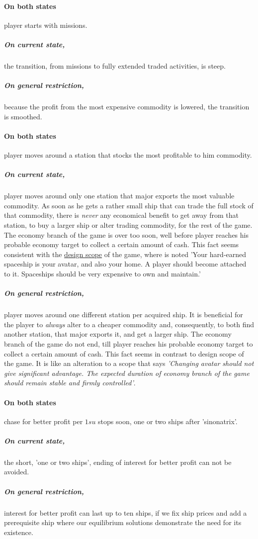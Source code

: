 \documentclass[]{article}
\begin{document}
\paragraph*{On both states} player starts with missions.
\subparagraph*{On current state,} the transition, from missions to fully extended traded activities, is steep.
\subparagraph*{On general restriction,} because the profit from the most expensive commodity is lowered, the transition is smoothed.
\paragraph{On both states} player moves around a station that stocks the most profitable to him commodity.
\subparagraph*{On current state,} player moves around only one station that major exports the most valuable commodity. As soon as he gets a rather small ship that can trade the full stock of that commodity, there is \emph{never} any economical benefit to get away from that station, to buy a larger ship or alter trading commodity, for the rest of the game. The economy branch of the game is over too soon, well before player reaches his probable economy target to collect a certain amount of cash. This fact seems consistent with the \hyperref{https://pioneerwiki.com/wiki/Design_Scope}{}{}{design scope} of the game, where is noted \textsf{'Your hard-earned spaceship is your avatar, and also your home. A player should become attached to it. Spaceships should be very expensive to own and maintain.'}
\subparagraph*{On general restriction,} player moves around one different station per acquired ship. It is beneficial for the player to \emph{always} alter to a cheaper commodity and, consequently, to both find another station, that major exports it, and get a larger ship. The economy branch of the game do not end, till player reaches his probable economy target to collect a certain amount of cash. This fact seems in contrast to design scope of the game. It is like an alteration to a scope that says \emph{'Changing avatar should not give significant advantage. The expected duration of economy branch of the game should remain stable and firmly controlled'}.   
\paragraph{On both states} chase for better profit per $1su$ stops soon, one or two ships after 'sinonatrix'.
\subparagraph*{On current state,} the short, 'one or two ships', ending of interest for better profit can not be avoided.
\subparagraph*{On general restriction,} interest for better profit can last up to ten ships, if we fix ship prices and add a prerequisite ship where our equilibrium solutions demonstrate the need for its existence. 
\end{document}
